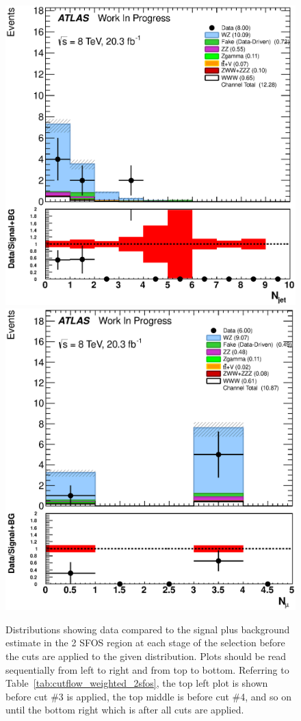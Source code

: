 \begin{figure}[ht!]
\includegraphics[width=0.3\columnwidth]{figures/appendix_signal_selection/Nov24Update_FakeSys_KFacSys_LinearY_Rebin/output/jobs/MxM/DataFull_Rates_May13_FakeRatesExactly2Loose_MuonMxMBJetGt0_ElBJetGt0SubtractPC_MxM/PreselectionNov23_15_2SFOS_ChargeAbs1_BVeto85_ZVeto20GeV_METGt55GeV_DeltaPhi2p5_physics/weight_all/eps/NJets_histratio.eps}
\includegraphics[width=0.3\columnwidth]{figures/appendix_signal_selection/Nov24Update_FakeSys_KFacSys_LinearY_Rebin/output/jobs/MxM/DataFull_Rates_May13_FakeRatesExactly2Loose_MuonMxMBJetGt0_ElBJetGt0SubtractPC_MxM/PreselectionNov23_15_2SFOS_ChargeAbs1_BVeto85_ZVeto20GeV_METGt55GeV_DeltaPhi2p5_NJetLt2_physics/weight_all/eps/NMuons_histratio.eps}



\caption{Distributions showing data compared to the signal plus background estimate in the 2 SFOS region at each stage 
of the selection before the cuts are applied to the given distribution. Plots should be read sequentially from left to right
and from top to bottom. 
Referring to Table~\ref{tab:cutflow_weighted_2sfos}, the top left
plot is shown before cut \#3 is applied, the top middle is before cut \#4, and
so on until the bottom right which is after all cuts are applied.}
\label{fig:2sfos}
\end{figure}

